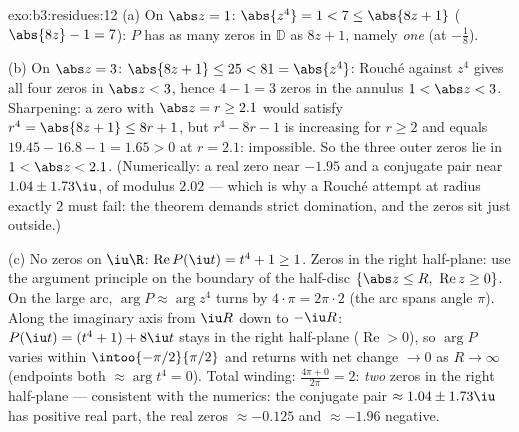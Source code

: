 \begin{solution}{exo:b3:residues:12}
(a) On $\abs z = 1$: $\abs{z^4} = 1 < 7 \leq \abs{8z + 1}$
($\abs{8z} - 1 = 7$): $P$ has as many zeros in $\mathbb D$
as $8z + 1$, namely \emph{one} (at $-\frac18$).

(b) On $\abs z = 3$: $\abs{8z + 1} \leq 25 < 81 =
\abs{z^4}$: Rouch\'e against $z^4$ gives all four zeros in
$\abs z < 3$, hence $4 - 1 = 3$ zeros in the annulus $1 <
\abs z < 3$. Sharpening: a zero with $\abs z = r \geq 2.1$
would satisfy $r^4 = \abs{8z + 1} \leq 8r + 1$, but $r^4 -
8r - 1$ is increasing for $r \geq 2$ and equals $19.45 -
16.8 - 1 = 1.65 > 0$ at $r = 2.1$: impossible. So the three
outer zeros lie in $1 < \abs z < 2.1$. (Numerically: a real
zero near $-1.95$ and a conjugate pair near $1.04 \pm
1.73\iu$, of modulus $2.02$ --- which is why a Rouch\'e
attempt at radius exactly $2$ must fail: the theorem demands
strict domination, and the zeros sit just outside.)

(c) No zeros on $\iu\R$: $\operatorname{Re}P(\iu t) = t^4 +
1 \geq 1$. Zeros in the right half-plane: use the argument
principle on the boundary of the half-disc $\{\abs z \leq
R,\ \operatorname{Re}z \geq 0\}$. On the large arc, $\arg P
\approx \arg z^4$ turns by $4\cdot\pi = 2\pi\cdot2$ (the
arc spans angle $\pi$). Along the imaginary axis from
$\iu R$ down to $-\iu R$: $P(\iu t) = (t^4 + 1) + 8\iu t$
stays in the right half-plane ($\operatorname{Re} > 0$), so
$\arg P$ varies within $\intoo{-\pi/2}{\pi/2}$ and returns
with net change $\to 0$ as $R \to \infty$ (endpoints both
$\approx \arg t^4 = 0$). Total winding: $\frac{4\pi + 0}
{2\pi} = 2$: \emph{two} zeros in the right half-plane ---
consistent with the numerics: the conjugate pair $\approx
1.04 \pm 1.73\iu$ has positive real part, the real zeros
$\approx -0.125$ and $\approx -1.96$ negative.
\end{solution}

